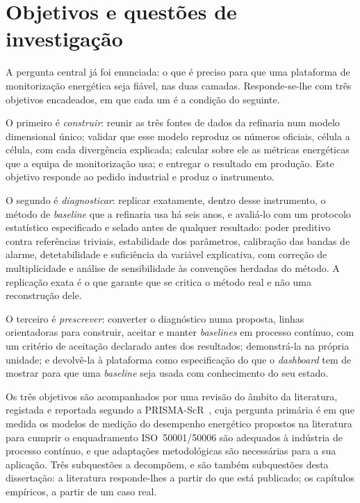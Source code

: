 \section{Objetivos e questões de investigação}
\label{sec:objetivos}

A pergunta central já foi enunciada: o que é preciso para que uma
plataforma de monitorização energética seja fiável, nas duas camadas.
Responde-se-lhe com três objetivos encadeados, em que cada um é a
condição do seguinte.

O primeiro é \emph{construir}: reunir as três fontes de dados da
refinaria num modelo dimensional único; validar que esse modelo
reproduz os números oficiais, célula a célula, com cada divergência
explicada; calcular sobre ele as métricas energéticas que a equipa de
monitorização usa; e entregar o resultado em produção. Este objetivo
responde ao pedido industrial e produz o instrumento.

O segundo é \emph{diagnosticar}: replicar exatamente, dentro desse
instrumento, o método de \emph{baseline} que a refinaria usa há seis
anos, e avaliá-lo com um protocolo estatístico especificado e selado
antes de qualquer resultado: poder preditivo contra referências
triviais, estabilidade dos parâmetros, calibração das bandas de alarme,
detetabilidade e suficiência da variável explicativa, com correção de
multiplicidade e análise de sensibilidade às convenções herdadas do
método. A replicação exata é o que garante que se critica o método real
e não uma reconstrução dele.

O terceiro é \emph{prescrever}: converter o diagnóstico numa proposta,
linhas orientadoras para construir, aceitar e manter \emph{baselines}
em processo contínuo, com um critério de aceitação declarado antes dos
resultados; demonstrá-la na própria unidade; e devolvê-la à plataforma
como especificação do que o \emph{dashboard} tem de mostrar para que uma
\emph{baseline} seja usada com conhecimento do seu estado.

Os três objetivos são acompanhados por uma revisão do
âmbito da literatura, registada e reportada segundo a
PRISMA-ScR~\cite{Tricco2018}, cuja pergunta primária é em que medida os
modelos de medição do desempenho energético propostos na literatura para
cumprir o enquadramento ISO~50001/50006 são adequados à indústria de
processo contínuo, e que adaptações metodológicas são necessárias para a
sua aplicação. Três subquestões a decompõem, e são também subquestões
desta dissertação: a literatura responde-lhes a partir do que está
publicado; os capítulos empíricos, a partir de um caso real.

